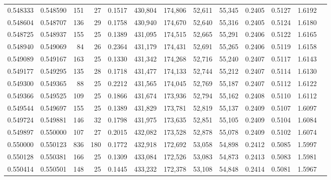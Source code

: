 \begin{tabular}{rrrrrrrrrrrrr}
0.548333 & 0.548590 &    151 &    27 &                                     0.1517 & 430,804 & 174,806 &  52,611 &  55,345 & 0.2405 & 0.5127 & 1.6192 \\
0.548604 & 0.548707 &    136 &    29 &                                     0.1758 & 430,940 & 174,670 &  52,640 &  55,316 & 0.2405 & 0.5124 & 1.6180 \\
0.548725 & 0.548937 &    155 &    25 &                                     0.1389 & 431,095 & 174,515 &  52,665 &  55,291 & 0.2406 & 0.5122 & 1.6165 \\
0.548940 & 0.549069 &     84 &    26 &                                     0.2364 & 431,179 & 174,431 &  52,691 &  55,265 & 0.2406 & 0.5119 & 1.6158 \\
0.549089 & 0.549167 &    163 &    25 &                                     0.1330 & 431,342 & 174,268 &  52,716 &  55,240 & 0.2407 & 0.5117 & 1.6143 \\
0.549177 & 0.549295 &    135 &    28 &                                     0.1718 & 431,477 & 174,133 &  52,744 &  55,212 & 0.2407 & 0.5114 & 1.6130 \\
0.549300 & 0.549365 &     88 &    25 &                                     0.2212 & 431,565 & 174,045 &  52,769 &  55,187 & 0.2407 & 0.5112 & 1.6122 \\
0.549366 & 0.549525 &    109 &    25 &                                     0.1866 & 431,674 & 173,936 &  52,794 &  55,162 & 0.2408 & 0.5110 & 1.6112 \\
0.549544 & 0.549697 &    155 &    25 &                                     0.1389 & 431,829 & 173,781 &  52,819 &  55,137 & 0.2409 & 0.5107 & 1.6097 \\
0.549724 & 0.549881 &    146 &    32 &                                     0.1798 & 431,975 & 173,635 &  52,851 &  55,105 & 0.2409 & 0.5104 & 1.6084 \\
0.549897 & 0.550000 &    107 &    27 &                                     0.2015 & 432,082 & 173,528 &  52,878 &  55,078 & 0.2409 & 0.5102 & 1.6074 \\
0.550000 & 0.550123 &    836 &   180 &                                     0.1772 & 432,918 & 172,692 &  53,058 &  54,898 & 0.2412 & 0.5085 & 1.5997 \\
0.550128 & 0.550381 &    166 &    25 &                                     0.1309 & 433,084 & 172,526 &  53,083 &  54,873 & 0.2413 & 0.5083 & 1.5981 \\
0.550414 & 0.550501 &    148 &    25 &                                     0.1445 & 433,232 & 172,378 &  53,108 &  54,848 & 0.2414 & 0.5081 & 1.5967 \\

\end{tabular}
